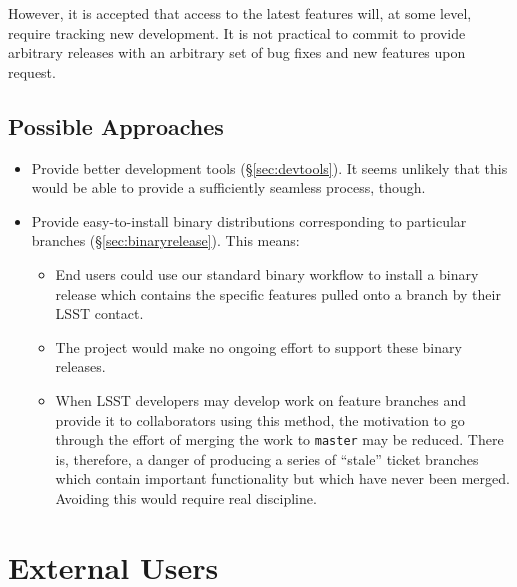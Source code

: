 \documentclass[DM,toc]{lsstdoc}
\begin{document}
However, it is accepted that access to the latest features will, at some
level, require tracking new development. It is not practical to commit to
provide arbitrary releases with an arbitrary set of bug fixes and new features
upon request.

\subsection{Possible Approaches}

\begin{itemize}

  \item{Provide better development tools (\S\ref{sec:devtools}). It seems
  unlikely that this would be able to provide a sufficiently seamless process,
  though.}

  \item{Provide easy-to-install binary distributions corresponding to
  particular branches (\S\ref{sec:binaryrelease}). This means:

    \begin{itemize}

      \item{End users could use our standard binary workflow to install a
      binary release which contains the specific features pulled onto a branch
      by their LSST contact.}

      \item{The project would make no ongoing effort to support these binary
      releases.}

      \item{When LSST developers may develop work on feature branches and
      provide it to collaborators using this method, the motivation to go
      through the effort of merging the work to \texttt{master} may be
      reduced. There is, therefore, a danger of producing a series of
      ``stale'' ticket branches which contain important functionality but
      which have never been merged. Avoiding this would require real
      discipline.}

    \end{itemize}

  }

\end{itemize}

\section{External Users}
\label{sec:externals}
\end{document}
